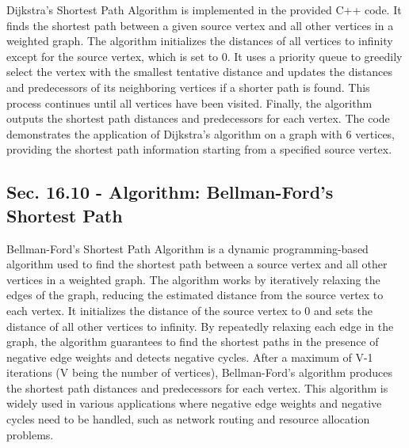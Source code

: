 \begin{solution}
\horizontalline

Dijkstra's Shortest Path Algorithm is implemented in the provided C++ code. It finds the shortest path between a given source vertex and all other vertices in a weighted graph. The algorithm initializes the distances of all 
vertices to infinity except for the source vertex, which is set to 0. It uses a priority queue to greedily select the vertex with the smallest tentative distance and updates the distances and predecessors of its neighboring 
vertices if a shorter path is found. This process continues until all vertices have been visited. Finally, the algorithm outputs the shortest path distances and predecessors for each vertex. The code demonstrates the application 
of Dijkstra's algorithm on a graph with 6 vertices, providing the shortest path information starting from a specified source vertex.

\end{solution}

\subsection*{Sec. 16.10 - Algorithm: Bellman-Ford's Shortest Path}

Bellman-Ford's Shortest Path Algorithm is a dynamic programming-based algorithm used to find the shortest path between a source vertex and all other vertices in a weighted graph. The algorithm works by iteratively relaxing the 
edges of the graph, reducing the estimated distance from the source vertex to each vertex. It initializes the distance of the source vertex to 0 and sets the distance of all other vertices to infinity. By repeatedly relaxing each 
edge in the graph, the algorithm guarantees to find the shortest paths in the presence of negative edge weights and detects negative cycles. After a maximum of V-1 iterations (V being the number of vertices), Bellman-Ford's algorithm 
produces the shortest path distances and predecessors for each vertex. This algorithm is widely used in various applications where negative edge weights and negative cycles need to be handled, such as network routing and resource 
allocation problems.

